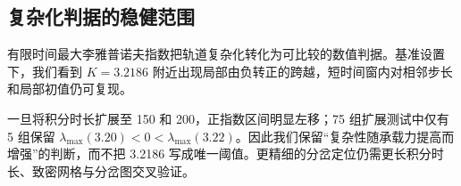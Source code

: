 \subsection{复杂化判据的稳健范围}
有限时间最大李雅普诺夫指数把轨道复杂化转化为可比较的数值判据。基准设置下，我们看到 $K=3.2186$ 附近出现局部由负转正的跨越，短时间窗内对相邻步长和局部初值仍可复现。

一旦将积分时长扩展至 150 和 200，正指数区间明显左移；75 组扩展测试中仅有 5 组保留 $\lambda_{\max}(3.20)<0<\lambda_{\max}(3.22)$。因此我们保留“复杂性随承载力提高而增强”的判断，而不把 3.2186 写成唯一阈值。更精细的分岔定位仍需更长积分时长、致密网格与分岔图交叉验证。

